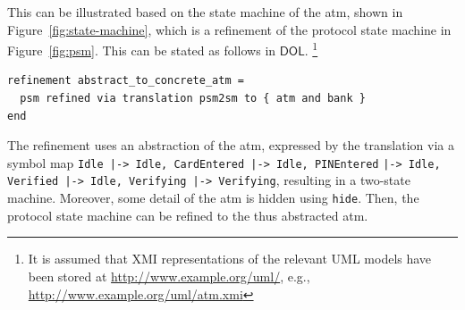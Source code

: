 \documentclass[10pt, a4paper]{isov2}
\newcommand*{\syntax}[1]{\texttt{#1}}
\newcommand*{\DOL}{\ensuremath{\mathsf{DOL}}\xspace}
\newcommand{\uml}[1]{\textsf{#1}}
\begin{document}
 This can be illustrated based on the state
machine of the \uml{atm}, shown in Figure~\ref{fig:state-machine}, which is a
refinement of the protocol state machine in Figure~\ref{fig:psm}. This can be stated as follows in \DOL.
\footnote{  It is assumed that XMI representations of the relevant UML models have been
stored at \url{http://www.example.org/uml/},
e.g., \url{http://www.example.org/uml/atm.xmi} }


\begin{lstlisting}[basicstyle=\ttfamily,language=dolText,escapechar=@,mathescape]
refinement abstract_to_concrete_atm =
  psm refined via translation psm2sm to { atm and bank }
end
\end{lstlisting}

The refinement uses an abstraction of the \uml{atm}, expressed by the
translation via a symbol map \texttt{Idle |-> Idle, CardEntered |-> Idle, PINEntered} \texttt{|-> Idle, Verified |-> Idle, Verifying |-> Verifying}, resulting in a two-state machine. Moreover, some detail of the \uml{atm} is hidden using
\syntax{hide}. Then, the protocol state machine can be refined to
the thus abstracted \uml{atm}.


\label{model-3}
\end{document}
